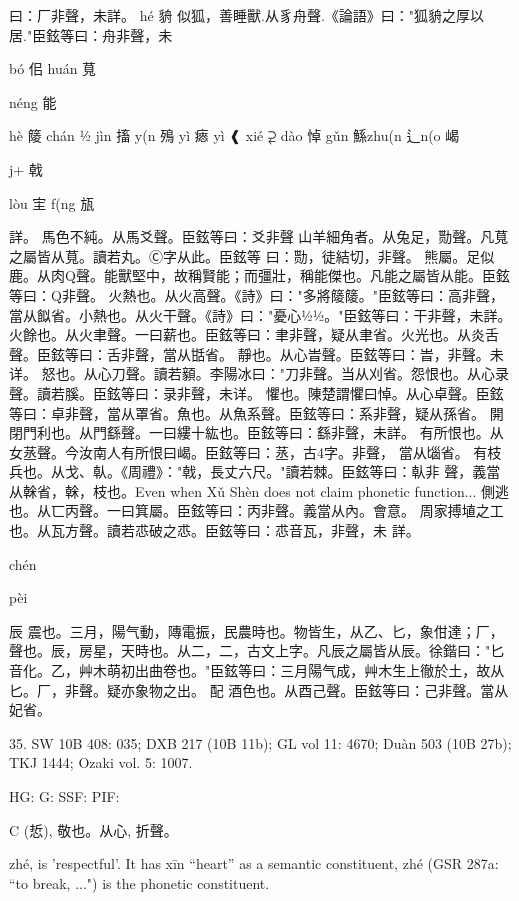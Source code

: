 曰：厂非聲，未詳。
hé
貈
似狐，善睡獸.从豸舟聲.《論語》曰："狐貈之厚以居."臣鉉等曰：舟非聲，未


bó	佀
huán   萈

néng	能

hè	䉄
chán	½
jìn	搐
y(n	殦
yì	瘱
yì	❰
xié	⥻
dào	悼
gǔn 鯀zhu(n 辶n(o     嵑

j+	戟

lòu	宔
f(ng	瓬

詳。
馬色不純。从馬爻聲。臣鉉等曰：爻非聲
山羊細角者。从兔足，勚聲。凡萈之屬皆从萈。讀若丸。Ⓒ字从此。臣鉉等 曰：勚，徒結切，非聲。
熊屬。足似鹿。从肉Q聲。能獸堅中，故稱賢能；而彊壯，稱能傑也。凡能之屬皆从能。臣鉉等曰：Q非聲。
火熱也。从火高聲。《詩》曰："多將䉄䉄。"臣鉉等曰：高非聲，當从䬮省。小熱也。从火干聲。《詩》曰："憂心½½。"臣鉉等曰：干非聲，未詳。
火餘也。从火聿聲。一曰薪也。臣鉉等曰：聿非聲，疑从聿省。火光也。从炎舌聲。臣鉉等曰：舌非聲，當从甛省。
靜也。从心旹聲。臣鉉等曰：旹，非聲。未详。
怒也。从心刀聲。讀若顡。李陽冰曰："刀非聲。当从刈省。怨恨也。从心录聲。讀若膎。臣鉉等曰：录非聲，未详。
懼也。陳楚謂懼曰悼。从心卓聲。臣鉉等曰：卓非聲，當从罩省。魚也。从魚系聲。臣鉉等曰：系非聲，疑从孫省。
開閉門利也。从門繇聲。一曰縷十紘也。臣鉉等曰：繇非聲，未詳。
有所恨也。从女䒱聲。今汝南人有所恨曰嵑。臣鉉等曰：䒱，古4字。非聲， 當从匘省。
有枝兵也。从戈、倝。《周禮》："戟，長丈六尺。"讀若棘。臣鉉等曰：倝非
聲，義當从榦省，榦，枝也。Even when Xǔ Shèn does not claim phonetic function...
側逃也。从匸丙聲。一曰箕屬。臣鉉等曰：丙非聲。義當从內。會意。
周家搏埴之工也。从瓦方聲。讀若怷破之怷。臣鉉等曰：怷音瓦，非聲，未 詳。




chén



pèi

辰 震也。三月，陽气動，䧠電振，民農時也。物皆生，从乙、匕，象佄達；厂， 聲也。辰，房星，天時也。从二，二，古文上字。凡辰之屬皆从辰。徐鍇曰："匕音化。乙，艸木萌初出曲卷也。"臣鉉等曰：三月陽气成，艸木生上徹於土，故从匕。厂，非聲。疑亦象物之出。
配 酒色也。从酉己聲。臣鉉等曰：己非聲。當从妃省。


35. SW 10B 408: 035; DXB 217 (10B 11b); GL vol 11: 4670; Duàn 503 (10B 27b); TKJ 1444; Ozaki vol. 5: 1007.



HG:
G: SSF: PIF:

C (悊),
敬也。从心, 折聲。


zhé,
is 'respectful'.
It has xīn ``heart'' as a semantic constituent,
zhé (GSR 287a: ``to break, ...") is the phonetic constituent.

